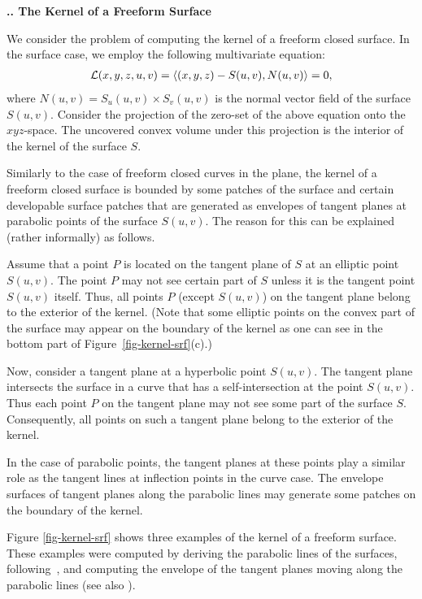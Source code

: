 \documentclass[twoside]{article}
\newcommand{\inner}[2]{\left<{#1}, {#2} \right>}
\newcounter{sectionc}\newcounter{subsectionc}\newcounter{subsubsectionc}
\renewcommand{\subsection}[1] {\vspace{12pt}\addtocounter{subsectionc}{1} 
	\setcounter{subsubsectionc}{0}\noindent 
	{\bf\thesectionc.\thesubsectionc. {\kern1pt \bfit #1}}\par\vspace{5pt}}
\begin{document}
\subsection{The Kernel of a Freeform Surface}
\label{subsec-kernel-surface}
\noindent
We consider the problem of computing the kernel of a freeform closed surface.
In the surface case, we employ the following multivariate equation:
\begin{eqnarray}
{\cal L}(x,y,z,u,v) = \inner{(x,y,z) - S(u,v)}{N(u,v)} = 0,
\label{eqn-kernel-srf}
\end{eqnarray}
where $N(u,v) = S_u(u,v) \times S_v(u,v)$ is the normal vector field of the 
surface $S(u,v)$.   Consider the projection of the zero-set of
the above equation onto the $xyz$-space.
The uncovered convex volume under this projection is
the interior of the kernel of the surface $S$.

Similarly to the case of freeform closed curves in the plane,
the kernel of a freeform closed surface is bounded
by some patches of the surface and 
certain developable surface patches that are generated as
envelopes of tangent planes at parabolic points of the surface $S(u,v)$.
The reason for this can be explained (rather informally) as follows.

Assume that a point $P$ is located on the tangent plane of $S$ at
an elliptic point $S(u,v)$.  The point $P$ may not see
certain part of $S$ unless it is the tangent point $S(u,v)$ itself.
Thus, all points $P$ (except $S(u,v)$) on the tangent plane belong to
the exterior of the kernel.  (Note that some elliptic points
on the convex part of the surface may appear on the boundary of the kernel
as one can see in the bottom part of Figure~\ref{fig-kernel-srf}(c).)

Now, consider a tangent plane at a hyperbolic point $S(u,v)$.
The tangent plane intersects the surface in a curve
that has a self-intersection at the point $S(u,v)$.
Thus each point $P$ on the tangent plane may not see
some part of the surface $S$.  Consequently, all points
on such a tangent plane belong to the exterior of the kernel.

In the case of parabolic points, the tangent planes
at these points play a similar role as the tangent lines
at inflection points in the curve case.
The envelope surfaces of tangent planes along the parabolic lines
may generate some patches on the boundary of the kernel.

Figure \ref{fig-kernel-srf} shows three examples of the kernel of a 
freeform surface. These examples were computed by deriving the parabolic
lines of the surfaces, following~\cite{5}, and computing the 
envelope of the tangent planes moving along the parabolic lines
(see also \cite{6}).
\end{document}
